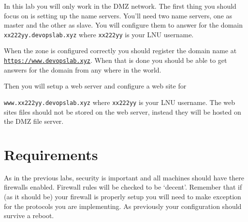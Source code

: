 \documentclass[paper=a4, fontsize=11pt]{report} %
\begin{document}
In this lab you will only work in the DMZ network. The first thing you should focus on is setting up the name servers.
You'll need two name servers, one as master and the other as slave. You will configure them to answer for the domain \texttt{xx222yy.devopslab.xyz} where \texttt{xx222yy} is your LNU username.

When the zone is configured correctly you should register the domain name at \texttt{\href{https://www.devopslab.xyz}{https://www.devopslab.xyz}}. When that is done you should be able to  get answers for the domain from any where in the world.

Then you will setup a web server and configure a web site for 

\texttt{www.xx222yy.devopslab.xyz} where \texttt{xx222yy} is your LNU username. The web sites files should not be stored on the web server, instead they will be hosted on the DMZ file server.
\pagebreak

\section{Requirements}
\label{tasks}
As in the previous labs, security is important and all machines should have there firewalls enabled. Firewall rules will be checked to be ‘decent’. Remember that if (as it should be) your firewall is properly setup you will need to make exception for the protocols you are implementing.
As previously your configuration should survive a reboot.
\end{document}
